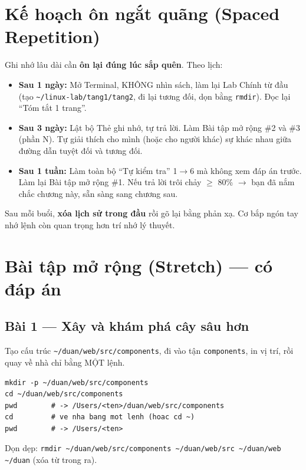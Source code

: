 \documentclass[12pt,a4paper]{article}
\newcommand{\hm}{\textasciitilde{}}
\begin{document}
\section{Kế hoạch ôn ngắt quãng (Spaced Repetition)}

Ghi nhớ lâu dài cần \textbf{ôn lại đúng lúc sắp quên}. Theo lịch:

\begin{itemize}[leftmargin=*]
  \item \textbf{Sau 1 ngày:} Mở Terminal, KHÔNG nhìn sách, làm lại Lab Chính từ đầu (tạo \texttt{\hm/linux-lab/tang1/tang2}, đi lại tương đối, dọn bằng \texttt{rmdir}). Đọc lại ``Tóm tắt 1 trang''.
  \item \textbf{Sau 3 ngày:} Lật bộ Thẻ ghi nhớ, tự trả lời. Làm Bài tập mở rộng \#2 và \#3 (phần N). Tự giải thích cho mình (hoặc cho người khác) sự khác nhau giữa đường dẫn tuyệt đối và tương đối.
  \item \textbf{Sau 1 tuần:} Làm toàn bộ ``Tự kiểm tra'' 1$\rightarrow$6 mà không xem đáp án trước. Làm lại Bài tập mở rộng \#1. Nếu trả lời trôi chảy $\geq$ 80\% $\rightarrow$ bạn đã nắm chắc chương này, sẵn sàng sang chương sau.
\end{itemize}

\begin{tipbox}[title={Mẹo senior}]
Sau mỗi buổi, \textbf{xóa lịch sử trong đầu} rồi gõ lại bằng phản xạ. Cơ bắp ngón tay nhớ lệnh còn quan trọng hơn trí nhớ lý thuyết.
\end{tipbox}

\section{Bài tập mở rộng (Stretch) --- có đáp án}

\subsection{Bài 1 --- Xây và khám phá cây sâu hơn}
Tạo cấu trúc \texttt{\hm/duan/web/src/components}, đi vào tận \texttt{components}, in vị trí, rồi quay về nhà chỉ bằng MỘT lệnh.

\begin{notebox}[title={Đáp án / kết quả mong đợi}]
\begin{codebox}
\begin{verbatim}
mkdir -p ~/duan/web/src/components
cd ~/duan/web/src/components
pwd        # -> /Users/<ten>/duan/web/src/components
cd         # ve nha bang mot lenh (hoac cd ~)
pwd        # -> /Users/<ten>
\end{verbatim}
\end{codebox}
Dọn dẹp: \texttt{rmdir \hm/duan/web/src/components \hm/duan/web/src \hm/duan/web \hm/duan} (xóa từ trong ra).
\end{notebox}
\end{document}

